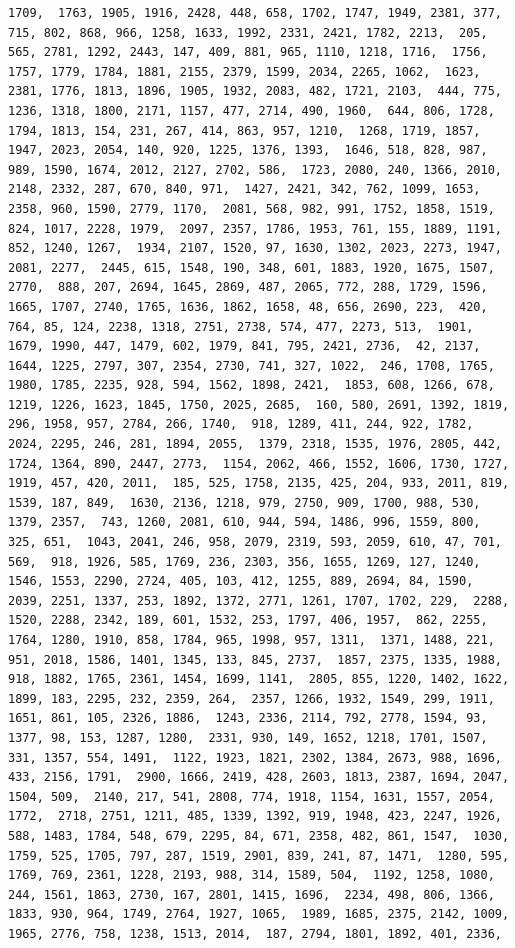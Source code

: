 \documentclass[
]{article}
\begin{document}
\begin{verbatim}
1709,  1763, 1905, 1916, 2428, 448, 658, 1702, 1747, 1949, 2381, 377,  715, 802, 868, 966, 1258, 1633, 1992, 2331, 2421, 1782, 2213,  205, 565, 2781, 1292, 2443, 147, 409, 881, 965, 1110, 1218, 1716,  1756, 1757, 1779, 1784, 1881, 2155, 2379, 1599, 2034, 2265, 1062,  1623, 2381, 1776, 1813, 1896, 1905, 1932, 2083, 482, 1721, 2103,  444, 775, 1236, 1318, 1800, 2171, 1157, 477, 2714, 490, 1960,  644, 806, 1728, 1794, 1813, 154, 231, 267, 414, 863, 957, 1210,  1268, 1719, 1857, 1947, 2023, 2054, 140, 920, 1225, 1376, 1393,  1646, 518, 828, 987, 989, 1590, 1674, 2012, 2127, 2702, 586,  1723, 2080, 240, 1366, 2010, 2148, 2332, 287, 670, 840, 971,  1427, 2421, 342, 762, 1099, 1653, 2358, 960, 1590, 2779, 1170,  2081, 568, 982, 991, 1752, 1858, 1519, 824, 1017, 2228, 1979,  2097, 2357, 1786, 1953, 761, 155, 1889, 1191, 852, 1240, 1267,  1934, 2107, 1520, 97, 1630, 1302, 2023, 2273, 1947, 2081, 2277,  2445, 615, 1548, 190, 348, 601, 1883, 1920, 1675, 1507, 2770,  888, 207, 2694, 1645, 2869, 487, 2065, 772, 288, 1729, 1596,  1665, 1707, 2740, 1765, 1636, 1862, 1658, 48, 656, 2690, 223,  420, 764, 85, 124, 2238, 1318, 2751, 2738, 574, 477, 2273, 513,  1901, 1679, 1990, 447, 1479, 602, 1979, 841, 795, 2421, 2736,  42, 2137, 1644, 1225, 2797, 307, 2354, 2730, 741, 327, 1022,  246, 1708, 1765, 1980, 1785, 2235, 928, 594, 1562, 1898, 2421,  1853, 608, 1266, 678, 1219, 1226, 1623, 1845, 1750, 2025, 2685,  160, 580, 2691, 1392, 1819, 296, 1958, 957, 2784, 266, 1740,  918, 1289, 411, 244, 922, 1782, 2024, 2295, 246, 281, 1894, 2055,  1379, 2318, 1535, 1976, 2805, 442, 1724, 1364, 890, 2447, 2773,  1154, 2062, 466, 1552, 1606, 1730, 1727, 1919, 457, 420, 2011,  185, 525, 1758, 2135, 425, 204, 933, 2011, 819, 1539, 187, 849,  1630, 2136, 1218, 979, 2750, 909, 1700, 988, 530, 1379, 2357,  743, 1260, 2081, 610, 944, 594, 1486, 996, 1559, 800, 325, 651,  1043, 2041, 246, 958, 2079, 2319, 593, 2059, 610, 47, 701, 569,  918, 1926, 585, 1769, 236, 2303, 356, 1655, 1269, 127, 1240,  1546, 1553, 2290, 2724, 405, 103, 412, 1255, 889, 2694, 84, 1590,  2039, 2251, 1337, 253, 1892, 1372, 2771, 1261, 1707, 1702, 229,  2288, 1520, 2288, 2342, 189, 601, 1532, 253, 1797, 406, 1957,  862, 2255, 1764, 1280, 1910, 858, 1784, 965, 1998, 957, 1311,  1371, 1488, 221, 951, 2018, 1586, 1401, 1345, 133, 845, 2737,  1857, 2375, 1335, 1988, 918, 1882, 1765, 2361, 1454, 1699, 1141,  2805, 855, 1220, 1402, 1622, 1899, 183, 2295, 232, 2359, 264,  2357, 1266, 1932, 1549, 299, 1911, 1651, 861, 105, 2326, 1886,  1243, 2336, 2114, 792, 2778, 1594, 93, 1377, 98, 153, 1287, 1280,  2331, 930, 149, 1652, 1218, 1701, 1507, 331, 1357, 554, 1491,  1122, 1923, 1821, 2302, 1384, 2673, 988, 1696, 433, 2156, 1791,  2900, 1666, 2419, 428, 2603, 1813, 2387, 1694, 2047, 1504, 509,  2140, 217, 541, 2808, 774, 1918, 1154, 1631, 1557, 2054, 1772,  2718, 2751, 1211, 485, 1339, 1392, 919, 1948, 423, 2247, 1926,  588, 1483, 1784, 548, 679, 2295, 84, 671, 2358, 482, 861, 1547,  1030, 1759, 525, 1705, 797, 287, 1519, 2901, 839, 241, 87, 1471,  1280, 595, 1769, 769, 2361, 1228, 2193, 988, 314, 1589, 504,  1192, 1258, 1080, 244, 1561, 1863, 2730, 167, 2801, 1415, 1696,  2234, 498, 806, 1366, 1833, 930, 964, 1749, 2764, 1927, 1065,  1989, 1685, 2375, 2142, 1009, 1965, 2776, 758, 1238, 1513, 2014,  187, 2794, 1801, 1892, 401, 2336, 
\end{verbatim}
\end{document}
